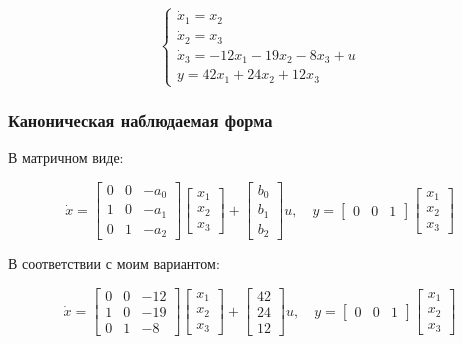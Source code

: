 \documentclass[a4paper,12pt]{article}
\begin{document}
	\[
	\begin{cases}
		\dot{x}_1 = x_2 \\[6pt]
		\dot{x}_2 = x_3 \\[6pt]
		\dot{x}_3 = -12 x_1 - 19 x_2 - 8 x_3 + u \\[6pt]
		y = 42 x_1 + 24 x_2 + 12 x_3
	\end{cases}
	\]
	
	\subsubsection{Каноническая наблюдаемая форма}
	
	В матричном виде:
	
	\[
	\dot{x} = 
	\begin{bmatrix}
		0 & 0 & -a_0 \\
		1 & 0 & -a_1 \\
		0 & 1 & -a_2
	\end{bmatrix} 
	\begin{bmatrix}
		x_1 \\ x_2 \\ x_3
	\end{bmatrix} 
	+ 
	\begin{bmatrix}
		b_0 \\ b_1 \\ b_2
	\end{bmatrix} u,
	\quad
	y = 
	\begin{bmatrix}
		0 & 0 & 1
	\end{bmatrix}
	\begin{bmatrix}
		x_1 \\ x_2 \\ x_3
	\end{bmatrix}
	\]
	
	В соответствии с моим вариантом: 
	
	\[
	\dot{x} = 
	\begin{bmatrix}
		0 & 0 & -12 \\
		1 & 0 & -19 \\
		0 & 1 & -8
	\end{bmatrix} 
	\begin{bmatrix}
		x_1 \\ x_2 \\ x_3
	\end{bmatrix} 
	+ 
	\begin{bmatrix}
		42 \\ 24 \\ 12
	\end{bmatrix} u,
	\quad
	y = 
	\begin{bmatrix}
		0 & 0 & 1
	\end{bmatrix}
	\begin{bmatrix}
		x_1 \\ x_2 \\ x_3
	\end{bmatrix}
	\]
	
\end{document}
